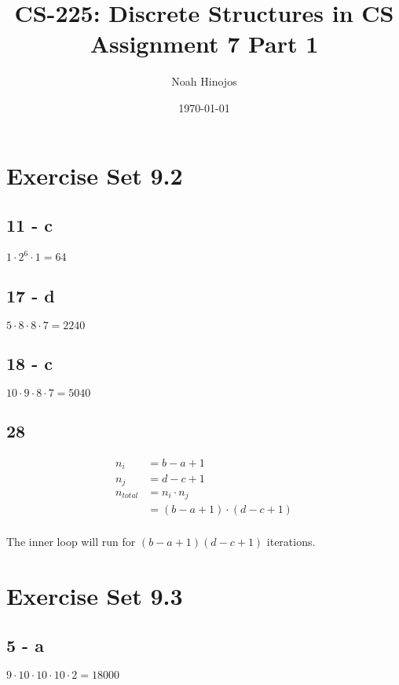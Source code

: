\documentclass[12pt]{article}
\title{
  \textbf{CS-225: Discrete Structures in CS} \\
  Assignment 7 Part 1
  }
\author{Noah Hinojos}
\date{\today}
\begin{document}
\maketitle
\section*{Exercise Set 9.2}
\subsection*{11 - c}
$1 \cdot 2^6 \cdot 1 = 64$


\subsection*{17 - d}
$5\cdot8\cdot8\cdot7 = 2240$

\subsection*{18 - c}
$10\cdot9\cdot8\cdot7 = 5040$

\subsection*{28}
\begin{align*}
  n_i &= b-a+1 \\
  n_j &= d-c+1 \\
  n_{total} &= n_i \cdot n_j \\
  &= (b-a+1) \cdot (d-c+1)
\end{align*}
\\
The inner loop will run for $(b-a+1)(d-c+1)$ iterations.


\section*{Exercise Set 9.3}
\subsection*{5 - a}
$9\cdot10\cdot10\cdot10\cdot2 = 18000$
\end{document}
